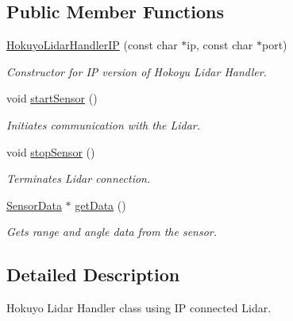 \subsection*{Public Member Functions}
\begin{DoxyCompactItemize}
\item 
\hyperlink{classrlib_1_1HokuyoLidarHandlerIP_a5670fe812188c2a47f2095161ed6d5a5}{Hokuyo\-Lidar\-Handler\-I\-P} (const char $\ast$ip, const char $\ast$port)
\begin{DoxyCompactList}\small\item\em Constructor for I\-P version of Hokoyu Lidar Handler. \end{DoxyCompactList}\item 
\hypertarget{classrlib_1_1HokuyoLidarHandlerIP_a379dbeec9ace02bb0d4840509f009576}{void \hyperlink{classrlib_1_1HokuyoLidarHandlerIP_a379dbeec9ace02bb0d4840509f009576}{start\-Sensor} ()}\label{classrlib_1_1HokuyoLidarHandlerIP_a379dbeec9ace02bb0d4840509f009576}

\begin{DoxyCompactList}\small\item\em Initiates communication with the Lidar. \end{DoxyCompactList}\item 
\hypertarget{classrlib_1_1HokuyoLidarHandlerIP_aafe7200d26d5a38642da2d58e6ccf2b3}{void \hyperlink{classrlib_1_1HokuyoLidarHandlerIP_aafe7200d26d5a38642da2d58e6ccf2b3}{stop\-Sensor} ()}\label{classrlib_1_1HokuyoLidarHandlerIP_aafe7200d26d5a38642da2d58e6ccf2b3}

\begin{DoxyCompactList}\small\item\em Terminates Lidar connection. \end{DoxyCompactList}\item 
\hyperlink{classrlib_1_1SensorData}{Sensor\-Data} $\ast$ \hyperlink{classrlib_1_1HokuyoLidarHandlerIP_af1b24513e31b16fb97b9a9124f29bc40}{get\-Data} ()
\begin{DoxyCompactList}\small\item\em Gets range and angle data from the sensor. \end{DoxyCompactList}\end{DoxyCompactItemize}


\subsection{Detailed Description}
Hokuyo Lidar Handler class using I\-P connected Lidar. 


